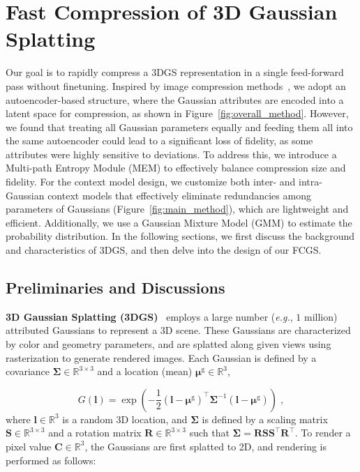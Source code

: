 \documentclass{article} %
\newcommand{\eg}{\textit{e.g.}}
\begin{document}
\section{Fast Compression of 3D Gaussian Splatting}

Our goal is to rapidly compress a 3DGS representation in a single feed-forward pass without finetuning. Inspired by image compression methods~\citep{balle}, we adopt an autoencoder-based structure, where the Gaussian attributes are encoded into a latent space for compression, as shown in Figure~\ref{fig:overall_method}. However, we found that treating all Gaussian parameters equally and feeding them all into the same autoencoder could lead to a significant loss of fidelity, as some attributes were highly sensitive to deviations. To address this, we introduce a Multi-path Entropy Module (MEM) to effectively balance compression size and fidelity. 
For the context model design, we customize both inter- and intra-Gaussian context models that effectively eliminate redundancies among parameters of Gaussians (Figure~\ref{fig:main_method}), which are lightweight and efficient. Additionally, we use a Gaussian Mixture Model (GMM) to estimate the probability distribution. In the following sections, we first discuss the background and characteristics of 3DGS, and then delve into the design of our FCGS.

\subsection{Preliminaries and Discussions}

\textbf{3D Gaussian Splatting (3DGS)}~\citep{3DGS} employs a large number (\eg, $1$ million) attributed Gaussians to represent a 3D scene. These Gaussians are characterized by color and geometry parameters, and are splatted along given views using rasterization to generate rendered images. Each Gaussian is defined by a covariance $\bm{\Sigma} \in \mathbb{R}^{3 \times 3}$ and a location (mean) $\bm{\mu}^\text{g} \in \mathbb{R}^{3}$,

\vspace{-10pt}
\begin{equation}
    G(\bm{l}) = \exp{\left(-\frac{1}{2}(\bm{l}-\bm{\mu}^\text{g})^\top\bm{\Sigma}^{-1}(\bm{l}-\bm{\mu}^\text{g})\right)}\;,
\end{equation}
where $\bm{l} \in \mathbb{R}^{3}$ is a random 3D location, and $\bm{\Sigma}$ is defined by a scaling matrix $\bm{S} \in \mathbb{R}^{3 \times 3}$ and a rotation matrix $\bm{R} \in \mathbb{R}^{3 \times 3}$ such that $\bm{\Sigma} = \bm{R}\bm{S}\bm{S}^\top\bm{R}^\top$. To render a pixel value $\bm{C} \in \mathbb{R}^{3}$, the Gaussians are first splatted to 2D, and rendering is performed as follows:
\end{document}
